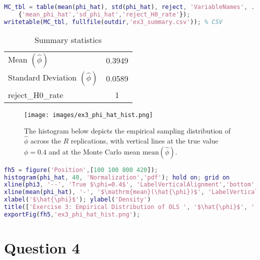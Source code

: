 \documentclass[dvipsnames,11pt]{article}
\begin{document}
\begin{solution}
\begin{lstlisting}[language=Matlab]
% Save a small summary table
MC_tbl = table(mean(phi_hat), std(phi_hat), reject, 'VariableNames', ...
    {'mean_phi_hat','sd_phi_hat','reject_H0_rate'});
writetable(MC_tbl, fullfile(outdir,'ex3_summary.csv')); % CSV
\end{lstlisting}

        \begin{table}[h]
            \centering
            \begin{tabular}{l c}
                \hline
                Mean $(\hat{\phi})$ & 0.3949 \\
                Standard Deviation $(\hat{\phi})$ & 0.0589 \\
                reject\_H0\_rate & 1 \\
                \hline
            \end{tabular}
            \caption{Summary statistics}
            \label{tab:phi_hat_summary}
        \end{table}

        \begin{figure}[h]
            \centering
            \caption{The histogram below depicts the empirical sampling distribution of $\widehat\phi$ across the $R$ replications, with vertical lines at the true value $\phi=0.4$ and at the Monte Carlo mean $\mathrm{mean}(\widehat\phi)$.}
            \texttt{[image: images/ex3\_phi\_hat\_hist.png]}
            \label{fig:ex3_phi_hat_hist}
        \end{figure}

\begin{lstlisting}[language=Matlab]
% Histogram of phi_hat with reference lines
fh5 = figure('Position',[100 100 800 420]);
histogram(phi_hat, 40, 'Normalization','pdf'); hold on; grid on
xline(phi3, '--', 'True $\phi=0.4$', 'LabelVerticalAlignment','bottom', 'Interpreter','latex');
xline(mean(phi_hat), '-', '$\mathrm{mean}(\hat{\phi})$', 'LabelVerticalAlignment','bottom', 'Interpreter','latex');
xlabel('$\hat{\phi}$'); ylabel('Density')
title(['Exercise 3: Empirical Distribution of OLS ', '$\hat{\phi}$', ' (R=', num2str(R), ', T=', num2str(T), ')'], 'Interpreter','latex')
exportFig(fh5,'ex3_phi_hat_hist.png');
\end{lstlisting}
        
    \end{solution}

\section*{Question 4}
\setcounter{section}{4}
\end{document}
